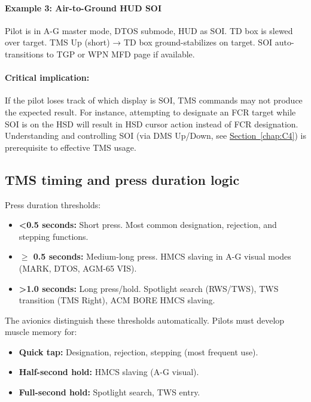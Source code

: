 \documentclass[11pt, a4paper, twoside]{report}
\newcommand{\secref}[1]{\hyperref[#1]{Section~\ref*{#1}}}
\begin{document}
\paragraph{Example 3: Air-to-Ground HUD SOI}
Pilot is in A-G master mode, DTOS submode, HUD as SOI. TD box is slewed over target. TMS Up (short) → TD box ground-stabilizes on target. SOI auto-transitions to TGP or WPN MFD page if available.

\paragraph{Critical implication:}
If the pilot loses track of which display is SOI, TMS commands may not produce the expected result. For instance, attempting to designate an FCR target while SOI is on the HSD will result in HSD cursor action instead of FCR designation. Understanding and controlling SOI (via DMS Up/Down, see \secref{chap:C4}) is prerequisite to effective TMS usage.

\subsection{TMS timing and press duration logic}
\label{sec:C4-S1-S4}

Press duration thresholds:
\begin{itemize}
    \item \textbf{<0.5 seconds:} Short press. Most common designation, rejection, and stepping functions.
    \item \textbf{$\geq$ 0.5 seconds:} Medium-long press. HMCS slaving in A-G visual modes (MARK, DTOS, AGM-65 VIS).
    \item \textbf{>1.0 seconds:} Long press/hold. Spotlight search (RWS/TWS), TWS transition (TMS Right), ACM BORE HMCS slaving.
\end{itemize}

The avionics distinguish these thresholds automatically. Pilots must develop muscle memory for:
\begin{itemize}
    \item \textbf{Quick tap:} Designation, rejection, stepping (most frequent use).
    \item \textbf{Half-second hold:} HMCS slaving (A-G visual).
    \item \textbf{Full-second hold:} Spotlight search, TWS entry.
\end{itemize}
\end{document}
